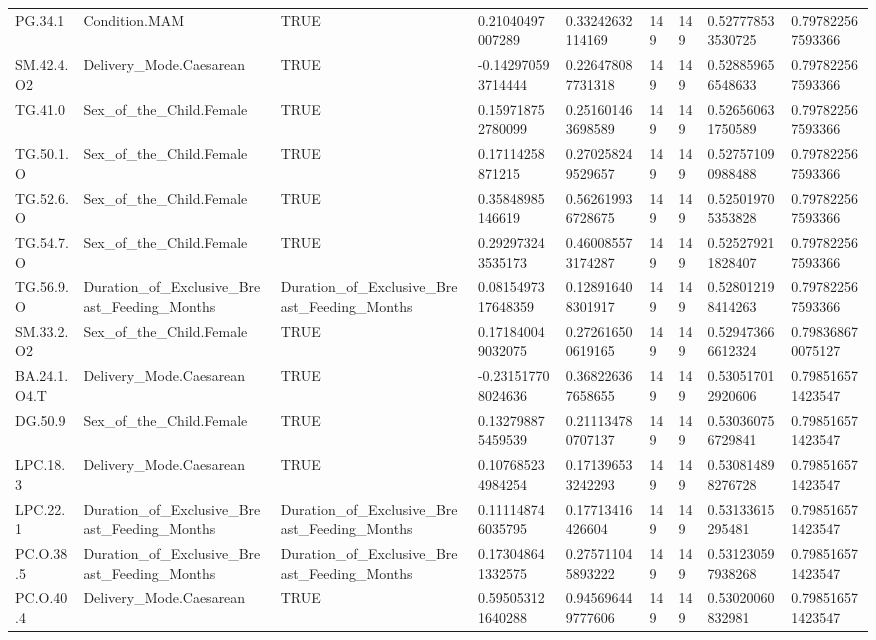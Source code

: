\begin{longtable}{lllllllll}
PG.34.1 & Condition.MAM & TRUE & 0.21040497007289 & 0.33242632114169 & 149 & 149 & 0.527778533530725 & 0.797822567593366 \\
SM.42.4.O2 & Delivery\_Mode.Caesarean & TRUE & -0.142970593714444 & 0.226478087731318 & 149 & 149 & 0.528859656548633 & 0.797822567593366 \\
TG.41.0 & Sex\_of\_the\_Child.Female & TRUE & 0.159718752780099 & 0.251601463698589 & 149 & 149 & 0.526560631750589 & 0.797822567593366 \\
TG.50.1.O & Sex\_of\_the\_Child.Female & TRUE & 0.17114258871215 & 0.270258249529657 & 149 & 149 & 0.527571090988488 & 0.797822567593366 \\
TG.52.6.O & Sex\_of\_the\_Child.Female & TRUE & 0.35848985146619 & 0.562619936728675 & 149 & 149 & 0.525019705353828 & 0.797822567593366 \\
TG.54.7.O & Sex\_of\_the\_Child.Female & TRUE & 0.292973243535173 & 0.460085573174287 & 149 & 149 & 0.525279211828407 & 0.797822567593366 \\
TG.56.9.O & Duration\_of\_Exclusive\_Breast\_Feeding\_Months & Duration\_of\_Exclusive\_Breast\_Feeding\_Months & 0.0815497317648359 & 0.128916408301917 & 149 & 149 & 0.528012198414263 & 0.797822567593366 \\
SM.33.2.O2 & Sex\_of\_the\_Child.Female & TRUE & 0.171840049032075 & 0.272616500619165 & 149 & 149 & 0.529473666612324 & 0.798368670075127 \\
BA.24.1.O4.T & Delivery\_Mode.Caesarean & TRUE & -0.231517708024636 & 0.368226367658655 & 149 & 149 & 0.530517012920606 & 0.798516571423547 \\
DG.50.9 & Sex\_of\_the\_Child.Female & TRUE & 0.132798875459539 & 0.211134780707137 & 149 & 149 & 0.530360756729841 & 0.798516571423547 \\
LPC.18.3 & Delivery\_Mode.Caesarean & TRUE & 0.107685234984254 & 0.171396533242293 & 149 & 149 & 0.530814898276728 & 0.798516571423547 \\
LPC.22.1 & Duration\_of\_Exclusive\_Breast\_Feeding\_Months & Duration\_of\_Exclusive\_Breast\_Feeding\_Months & 0.111148746035795 & 0.17713416426604 & 149 & 149 & 0.53133615295481 & 0.798516571423547 \\
PC.O.38.5 & Duration\_of\_Exclusive\_Breast\_Feeding\_Months & Duration\_of\_Exclusive\_Breast\_Feeding\_Months & 0.173048641332575 & 0.275711045893222 & 149 & 149 & 0.531230597938268 & 0.798516571423547 \\
PC.O.40.4 & Delivery\_Mode.Caesarean & TRUE & 0.595053121640288 & 0.945696449777606 & 149 & 149 & 0.53020060832981 & 0.798516571423547 \\

\end{longtable}
